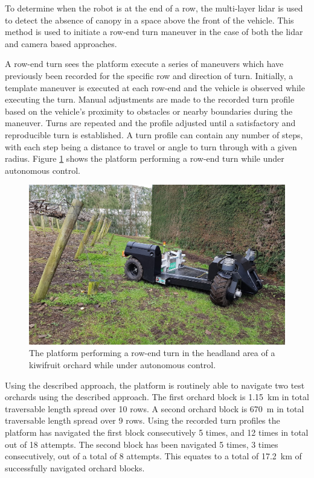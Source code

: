 \documentclass[preprint,authoryear,12pt]{elsarticle}
\begin{document}
    To determine when the robot is at the end of a row, the multi-layer lidar is used to detect the absence of canopy in a space above the front of the vehicle.
    This method is used to initiate a row-end turn maneuver in the case of both the lidar and camera based approaches.

    A row-end turn sees the platform execute a series of maneuvers which have previously been recorded for the specific row and direction of turn.
    Initially, a template maneuver is executed at each row-end and the vehicle is observed while executing the turn.
    Manual adjustments are made to the recorded turn profile based on the vehicle's proximity to obstacles or nearby boundaries during the maneuver.
    Turns are repeated and the profile adjusted until a satisfactory and reproducible turn is established.
    A turn profile can contain any number of steps, with each step being a distance to travel or angle to turn through with a given radius.
    Figure \ref{fig:suzy_turning} shows the platform performing a row-end turn while under autonomous control.

    \begin{figure}[htb]
        \centering
        \includegraphics[width=\linewidth]{imgs/photos/suzy_turning.jpg}
        \caption{
            The platform performing a row-end turn in the headland area of a kiwifruit orchard while under autonomous control.
        }
        \label{fig:suzy_turning}
    \end{figure}

    Using the described approach, the platform is routinely able to navigate two test orchards using the described approach.
    The first orchard block is \SI{1.15}{\kilo\meter} in total traversable length spread over 10 rows.
    A second orchard block is \SI{670}{\meter} in total traversable length spread over 9 rows.
    Using the recorded turn profiles the platform has navigated the first block consecutively 5 times, and 12 times in total out of 18 attempts.
    The second block has been navigated 5 times, 3 times consecutively, out of a total of 8 attempts.
    This equates to a total of \SI{17.2}{\kilo\meter} of successfully navigated orchard blocks.
\end{document}

